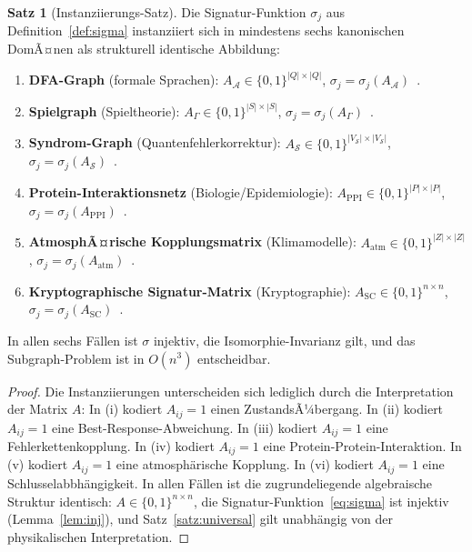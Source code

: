 ﻿\documentclass[a4paper,12pt]{article}
\theoremstyle{definition}
\newtheorem{satz}{Satz}
\begin{document}
\begin{satz}[Instanziierungs-Satz]
\label{satz:instanz}
Die Signatur-Funktion $\sigma_j$ aus Definition~\ref{def:sigma}
instanziiert sich in mindestens sechs kanonischen DomÃ¤nen als
strukturell identische Abbildung:
\begin{enumerate}[label=(\roman*)]
    \item \textbf{DFA-Graph} (formale Sprachen):
          $A_{\mathcal{A}} \in \{0,1\}^{|Q|\times|Q|}$,
          $\sigma_j = \sigma_j(A_{\mathcal{A}})$~\cite{epp2026grammatik}.
    \item \textbf{Spielgraph} (Spieltheorie):
          $A_\Gamma \in \{0,1\}^{|S|\times|S|}$,
          $\sigma_j = \sigma_j(A_\Gamma)$~\cite{epp2026spieltheorie}.
    \item \textbf{Syndrom-Graph} (Quantenfehlerkorrektur):
          $A_{\mathcal{S}} \in \{0,1\}^{|V_{\mathcal{S}}|\times|V_{\mathcal{S}}|}$,
          $\sigma_j = \sigma_j(A_{\mathcal{S}})$~\cite{epp2026qecc}.
    \item \textbf{Protein-Interaktionsnetz} (Biologie/Epidemiologie):
          $A_{\mathrm{PPI}} \in \{0,1\}^{|P|\times|P|}$,
          $\sigma_j = \sigma_j(A_{\mathrm{PPI}})$~\cite{epp2026gen}.
    \item \textbf{AtmosphÃ¤rische Kopplungsmatrix} (Klimamodelle):
          $A_{\mathrm{atm}} \in \{0,1\}^{|Z|\times|Z|}$,
          $\sigma_j = \sigma_j(A_{\mathrm{atm}})$~\cite{epp2026klima}.
    \item \textbf{Kryptographische Signatur-Matrix} (Kryptographie):
          $A_{\mathrm{SC}} \in \{0,1\}^{n\times n}$,
          $\sigma_j = \sigma_j(A_{\mathrm{SC}})$~\cite{epp2026sigchiffre}.
\end{enumerate}
In allen sechs F\"allen ist $\sigma$ injektiv, die Isomorphie-Invarianz
gilt, und das Subgraph-Problem ist in $O(n^3)$ entscheidbar.
\end{satz}

\begin{proof}
Die Instanziierungen unterscheiden sich lediglich durch die Interpretation
der Matrix $A$:
In (i) kodiert $A_{ij} = 1$ einen ZustandsÃ¼bergang.
In (ii) kodiert $A_{ij} = 1$ eine Best-Response-Abweichung.
In (iii) kodiert $A_{ij} = 1$ eine Fehlerkettenkopplung.
In (iv) kodiert $A_{ij} = 1$ eine Protein-Protein-Interaktion.
In (v) kodiert $A_{ij} = 1$ eine atmosph\"arische Kopplung.
In (vi) kodiert $A_{ij} = 1$ eine Schlusselabbh\"angigkeit.
In allen F\"allen ist die zugrundeliegende algebraische Struktur identisch:
$A \in \{0,1\}^{n\times n}$, die Signatur-Funktion~\eqref{eq:sigma}
ist injektiv (Lemma~\ref{lem:inj}), und Satz~\ref{satz:universal}
gilt unabh\"angig von der physikalischen Interpretation.
\end{proof}
\end{document}
